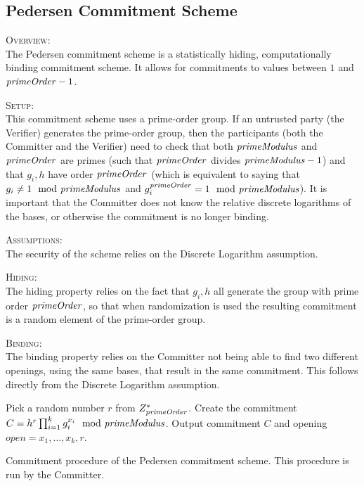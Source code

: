 \subsection{Pedersen Commitment Scheme}

\textsc{Overview}:\\
The Pedersen commitment scheme \cite{pedersen:secret-sharing:c91} is a statistically hiding, computationally binding commitment scheme. It allows for commitments to values between $1$ and $ \mathit{primeOrder}-1 $.


\textsc{Setup}:\\
This commitment scheme uses a prime-order group.  If an untrusted party (\eg the Verifier) generates the prime-order group, then the participants (both the Committer and the Verifier) need to check that both $ \mathit{primeModulus} $ and $ \mathit{primeOrder} $ are primes (such that $ \mathit{primeOrder} $ divides $ \mathit{primeModulus} - 1 $) and that $g_i,h$ have order $ \mathit{primeOrder} $ (which is equivalent to saying that $g_i \neq 1 \mod {\mathit{primeModulus}}$ and $g_{i}^{\mathit{primeOrder}} = 1 \mod {\mathit{primeModulus}}$). It is important that the Committer does not know the relative discrete logarithms of the bases, or otherwise the commitment is no longer binding.


\textsc{Assumptions}:\\
The security of the scheme relies on the Discrete Logarithm assumption.


\textsc{Hiding}:\\
The hiding property relies on the fact that $g_i,h$ all generate the group with prime order $ \mathit{primeOrder} $, so that when randomization is used the resulting commitment is a random element of the prime-order group.


\textsc{Binding}:\\
The binding property relies on the Committer not being able to find two different openings, using the same bases, that result in the same commitment.  This follows directly from the Discrete Logarithm assumption.



\begin{algorithm}[H]\label{commitP}
\dontprintsemicolon

\BlankLine

 \;
\Indp
  Pick a random number $r$ from $Z_{\mathit{primeOrder}}^*$. \;
  Create the commitment $C = h^r \prod_{i=1}^{k} g_i^{x_i} \mod {\mathit{primeModulus}} $. \;
  Output commitment $C$ and opening $open = x_1,\ldots,x_k,r$. \;
\Indm

\caption{Commitment procedure of the Pedersen commitment scheme. This procedure is run by the Committer.}
\end{algorithm}


